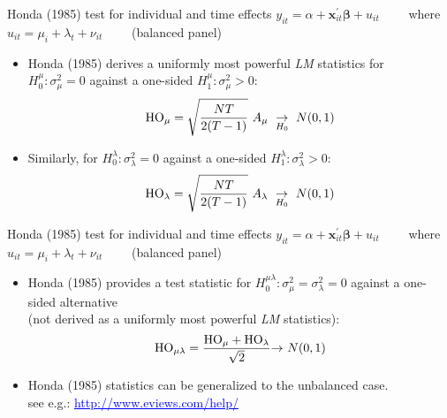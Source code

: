 \documentclass{beamer}
\begin{document}
\begin{frame}{Honda (1985) test for individual and time effects}
$y_{it} = \alpha + \bm{x}^{\prime}_{it} \bm{\beta} + u_{it} \qquad$    where $u_{it}=\mu_i + \lambda_t + \nu_{it} \qquad$ (balanced panel)\\ \medskip
\begin{itemize}
    \item Honda (1985) derives a uniformly most powerful {\it LM} statistics for \\
    $H_0^{\mu}: \sigma_{\mu}^2=0$ against a one-sided $H_1^{\mu}: \sigma_{\mu}^2>0$:
    $$
    \textnormal{HO}_{\mu} = \sqrt{\frac{NT}{2(T-1)}} ~ A_{\mu} ~ \underset{H_0}{\rightarrow}~N(0,1)
    $$
    \item Similarly, for $H_0^{\lambda}: \sigma_{\lambda}^2=0$ against a one-sided $H_1^{\lambda}: \sigma_{\lambda}^2>0$:
    $$
    \textnormal{HO}_{\lambda} = \sqrt{\frac{NT}{2(T-1)}} ~ A_{\lambda} ~ \underset{H_0}{\rightarrow}~N(0,1)
    $$
\end{itemize}    
\end{frame}
\begin{frame}{Honda (1985) test for individual and time effects}
$y_{it} = \alpha + \bm{x}^{\prime}_{it} \bm{\beta} + u_{it} \qquad$    where $u_{it}=\mu_i + \lambda_t + \nu_{it} \qquad$ (balanced panel)\\ \medskip
\begin{itemize}
    \item Honda (1985) provides a test statistic for $H_0^{\mu \lambda}: \sigma_{\mu}^2=\sigma_{\lambda}^2=0$ against a one-sided alternative
    \\(not derived as a uniformly most powerful {\it LM} statistics):
    $$
    \textnormal{HO}_{\mu \lambda} = \frac{\textnormal{HO}_{\mu}+\textnormal{HO}_{\lambda}}{\sqrt{2}} {\rightarrow}~N(0,1)
    $$
    \bigskip
    \item Honda (1985) statistics can be generalized to the unbalanced case. \\see e.g.: \footnotesize{\textcolor{blue}{\underline{http://www.eviews.com/help/}}}
\end{itemize}    
\end{frame}
\end{document}

